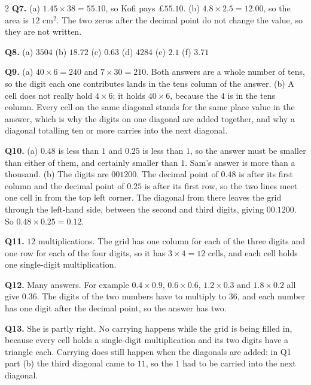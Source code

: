 \documentclass[12pt,a4paper]{article}
\begin{document}
{\begin{multicols}{2}
\textbf{Q7.} (a) $1.45\times38=55.10$, so Kofi pays \pounds$55.10$. \quad
(b) $4.8\times2.5=12.00$, so the area is $12$ cm$^2$. The two zeros after the
decimal point do not change the value, so they are not written.

\textbf{Q8.} (a) $3504$ \quad (b) $18.72$ \quad (c) $0.63$ \quad (d) $4284$
\quad (e) $2.1$ \quad (f) $3.71$

\textbf{Q9.} (a) $40\times6=240$ and $7\times30=210$. Both answers are a whole
number of tens, so the digit each one contributes lands in the tens column of
the answer. \quad
(b) A cell does not really hold $4\times6$; it holds $40\times6$, because the
$4$ is in the tens column. Every cell on the same diagonal stands for the same
place value in the answer, which is why the digits on one diagonal are added
together, and why a diagonal totalling ten or more carries into the next
diagonal.

\textbf{Q10.} (a) $0.48$ is less than $1$ and $0.25$ is less than $1$, so the
answer must be smaller than either of them, and certainly smaller than $1$.
Sam's answer is more than a thousand. \quad
(b) The digits are $001200$. The decimal point of $0.48$ is after its first
column and the decimal point of $0.25$ is after its first row, so the two lines
meet one cell in from the top left corner. The diagonal from there leaves the
grid through the left-hand side, between the second and third digits, giving
$00.1200$. So $0.48\times0.25=0.12$.

\textbf{Q11.} $12$ multiplications. The grid has one column for each of the
three digits and one row for each of the four digits, so it has $3\times4=12$
cells, and each cell holds one single-digit multiplication.

\textbf{Q12.} Many answers. For example $0.4\times0.9$, $0.6\times0.6$,
$1.2\times0.3$ and $1.8\times0.2$ all give $0.36$. The digits of the two
numbers have to multiply to $36$, and each number has one digit after the
decimal point, so the answer has two.

\textbf{Q13.} She is partly right. No carrying happens while the grid is being
filled in, because every cell holds a single-digit multiplication and its two
digits have a triangle each. Carrying does still happen when the diagonals are
added: in Q1 part (b) the third diagonal came to $11$, so the $1$ had to be
carried into the next diagonal.

\end{multicols}
}
\end{document}
